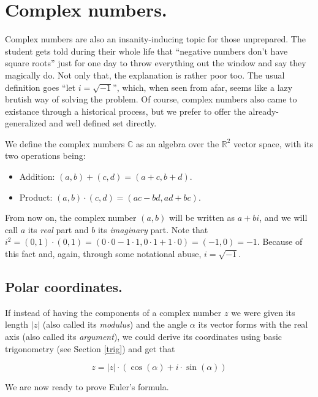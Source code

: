 \section{Complex numbers.}

Complex numbers are also an insanity-inducing topic for those unprepared. The student gets told during their whole life that \enquote{negative numbers don't have square roots} just for one day to throw everything out the window and say they magically do. Not only that, the explanation is rather poor too. The usual definition goes \enquote{let $i = \sqrt{-1}$}, which, when seen from afar, seems like a lazy brutish way of solving the problem. Of course, complex numbers also came to existance through a historical process, but we prefer to offer the already-generalized and well defined set directly.

We define the complex numbers $\mathbb{C}$ as an algebra over the $\mathbb{R}^2$ vector space, with its two operations being:

\begin{itemize}
	\item Addition: $(a, b) + (c, d) = (a + c, b + d)$.
	\item Product: $(a, b) \cdot (c, d) = (ac - bd, ad + bc)$.
\end{itemize}

From now on, the complex number $(a, b)$ will be written as $a + bi$, and we will call $a$ its \textit{real} part and $b$ its \textit{imaginary} part. Note that $i^2 = (0, 1) \cdot (0, 1) = (0 \cdot 0 - 1 \cdot 1, 0 \cdot 1 + 1 \cdot 0) = (-1, 0) = -1$. Because of this fact and, again, through some notational abuse, $i = \sqrt{-1}$.

\subsection{Polar coordinates.}

If instead of having the components of a complex number $z$ we were given its length $|z|$ (also called its \textit{modulus}) and the angle $\alpha$ its vector forms with the real axis (also called its \textit{argument}), we could derive its coordinates using basic trigonometry (see Section \ref{trig}) and get that

$$z = |z| \cdot (\cos(\alpha) + i\cdot \sin(\alpha))$$

We are now ready to prove Euler's formula.

\newpage
